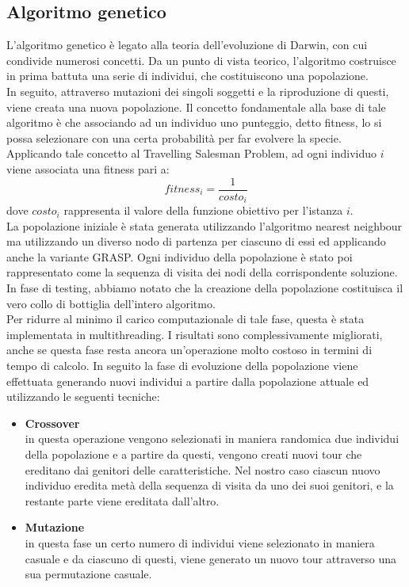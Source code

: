 \subsection{Algoritmo genetico}
L'algoritmo genetico è legato alla teoria dell'evoluzione di Darwin, con cui condivide numerosi concetti. Da un punto di vista teorico, l'algoritmo costruisce in prima battuta una serie di individui, che costituiscono una popolazione.\\
In seguito, attraverso mutazioni dei singoli soggetti e la riproduzione di questi, viene creata una nuova popolazione. Il concetto fondamentale alla base di tale algoritmo è che associando ad un individuo uno punteggio, detto fitness, lo si possa selezionare con una certa probabilità per far evolvere la specie.\\
Applicando tale concetto al Travelling Salesman Problem, ad ogni individuo $i$ viene associata una fitness pari a:
$$fitness_i=\frac{1}{costo_i}$$
dove $costo_i$ rappresenta il valore della funzione obiettivo per l'istanza $i$.\\
La popolazione iniziale è stata generata utilizzando l'algoritmo nearest neighbour ma utilizzando un diverso nodo di partenza per ciascuno di essi ed applicando anche la variante GRASP. Ogni individuo della popolazione è stato poi rappresentato come la sequenza di visita dei nodi della corrispondente soluzione.\\
In fase di testing, abbiamo notato che la creazione della popolazione costituisca il vero collo di bottiglia dell'intero algoritmo.\\
Per ridurre al minimo il carico computazionale di tale fase, questa è stata implementata in multithreading. I risultati sono complessivamente migliorati, anche se questa fase resta ancora un'operazione molto costoso in termini di tempo di calcolo.
In seguito la fase di evoluzione della popolazione viene effettuata generando nuovi individui a partire dalla popolazione attuale ed utilizzando le seguenti tecniche:
\begin{itemize}
\item{\textbf{Crossover}\\
in questa operazione vengono selezionati in maniera randomica due individui della popolazione e a partire da questi, vengono creati nuovi tour che ereditano dai genitori delle caratteristiche. Nel nostro caso ciascun nuovo individuo eredita metà della sequenza di visita da uno dei suoi genitori, e la restante parte viene ereditata dall'altro.}
\item{\textbf{Mutazione}\\
in questa fase un certo numero di individui viene selezionato in maniera casuale e da ciascuno di questi, viene generato un nuovo tour attraverso una sua permutazione casuale.}
\end{itemize}
